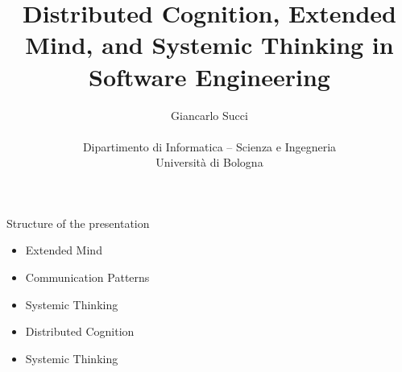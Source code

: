 \documentclass{beamer}
\title[L04]{Distributed Cognition, Extended Mind, and Systemic Thinking in Software Engineering} %
\author[{\tiny Giancarlo Succi }]{Giancarlo Succi\\\\ Dipartimento di Informatica -- Scienza e Ingegneria\\Universit\`{a} di Bologna\\
\bftt{g.succi@unibo.it}
} %
\institute[unibo] %
\date{} %
\begin{document}
\begin{frame}
\titlepage %

\end{frame}





\begin{frame}
{\centerline{Structure of the presentation}}
\begin{itemize}
    \item Extended Mind
    \item Communication Patterns
    \item Systemic Thinking
    \item Distributed Cognition
    \item Systemic Thinking
    \end{itemize}
\end{frame}
\end{document}
